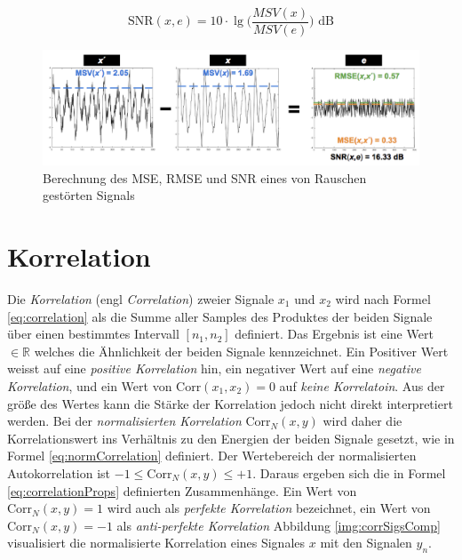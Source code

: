 \begin{equation}
\text{SNR}(x,e) = 10 \cdot  \lg \Big(\frac{MSV(x)}{MSV(e)} \Big) \text{ dB}
\label{eq:snrDb}
\end{equation}

\begin{figure}[h]
	\centering
	\includegraphics[width=1\textwidth]{bilder/snrStuff02.png}
	\caption{Berechnung des MSE, RMSE und SNR eines von Rauschen gestörten Signals}
	\label{img:snrStuff}
\end{figure}

\section{Korrelation}

Die \emph{Korrelation} (engl \emph{Correlation}) zweier Signale $x_1$ und $x_2$ wird nach Formel \ref{eq:correlation} als die Summe aller Samples des Produktes der beiden Signale über einen bestimmtes Intervall $[n_1, n_2]$ definiert. Das Ergebnis ist eine Wert $\in \mathbb{R}$ welches die \glqq Ähnlichkeit der beiden Signale\grqq{} kennzeichnet. Ein Positiver Wert weisst auf eine \emph{positive Korrelation} hin, ein negativer Wert auf eine \emph{negative Korrelation}, und ein Wert von $\text{Corr}(x_1,x_2) = 0$ auf \emph{keine Korrelatoin}. Aus der größe des Wertes kann die Stärke der Korrelation jedoch nicht direkt interpretiert werden. Bei der \emph{normalisierten Korrelation} Corr$_N(x,y)$ wird daher die Korrelationswert ins Verhältnis zu den Energien der beiden Signale gesetzt, wie in Formel \ref{eq:normCorrelation} definiert. Der Wertebereich der normalisierten Autokorrelation  ist $-1 \leq \text{Corr}_N(x,y) \leq +1$. Daraus ergeben sich die in Formel \ref{eq:correlationProps} definierten Zusammenhänge. Ein Wert von $ \text{Corr}_N(x,y) = 1$ wird auch als \emph{perfekte Korrelation} bezeichnet, ein Wert von  $ \text{Corr}_N(x,y) = -1$ als \emph{anti-perfekte Korrelation} \cite[S. 46 - 47]{dspMichigan} Abbildung \ref{img:corrSigsComp} visualisiert die normalisierte Korrelation eines Signales $x$ mit den Signalen $y_n$.

